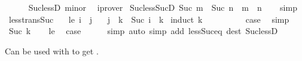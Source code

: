 \begin{isabellebody}
\ \ \ \ \isamarkupfalse%
\ Suc{\isacharunderscore}{\kern0pt}lessD\ minor\ \isamarkupfalse%
\ iprover\isanewline
{}\isamarkupfalse%
%
\endisatagproof
{\isafoldproof}%
%
\isadelimproof
\isanewline
%
\endisadelimproof
\isanewline
{}\isamarkupfalse%
\ Suc{\isacharunderscore}{\kern0pt}less{\isacharunderscore}{\kern0pt}SucD{\isacharcolon}{\kern0pt}\ {\isachardoublequoteopen}Suc\ m\ {\isacharless}{\kern0pt}\ Suc\ n\ {\isasymLongrightarrow}\ m\ {\isacharless}{\kern0pt}\ n{\isachardoublequoteclose}\isanewline
%
\isadelimproof
\ \ %
\endisadelimproof
%
\isatagproof
{}\isamarkupfalse%
\ simp%
\endisatagproof
{\isafoldproof}%
%
\isadelimproof
\isanewline
%
\endisadelimproof
\isanewline
{}\isamarkupfalse%
\ less{\isacharunderscore}{\kern0pt}trans{\isacharunderscore}{\kern0pt}Suc{\isacharcolon}{\kern0pt}\isanewline
\ \ \ le{\isacharcolon}{\kern0pt}\ {\isachardoublequoteopen}i\ {\isacharless}{\kern0pt}\ j{\isachardoublequoteclose}\isanewline
\ \ \ {\isachardoublequoteopen}j\ {\isacharless}{\kern0pt}\ k\ {\isasymLongrightarrow}\ Suc\ i\ {\isacharless}{\kern0pt}\ k{\isachardoublequoteclose}\isanewline
%
\isadelimproof
%
\endisadelimproof
%
\isatagproof
{}\isamarkupfalse%
\ {\isacharparenleft}{\kern0pt}induct\ k{\isacharparenright}{\kern0pt}\isanewline
\ \ \isamarkupfalse%
\ {}\isanewline
\ \ \isamarkupfalse%
\ \isamarkupfalse%
\ {\isacharquery}{\kern0pt}case\ \isamarkupfalse%
\ simp\isanewline
{}\isamarkupfalse%
\isanewline
\ \ \isamarkupfalse%
\ {\isacharparenleft}{\kern0pt}Suc\ k{\isacharparenright}{\kern0pt}\isanewline
\ \ \isamarkupfalse%
\ le\ \isamarkupfalse%
\ {\isacharquery}{\kern0pt}case\isanewline
\ \ \ \ \isamarkupfalse%
\ simp\ {\isacharparenleft}{\kern0pt}auto\ simp\ add{\isacharcolon}{\kern0pt}\ less{\isacharunderscore}{\kern0pt}Suc{\isacharunderscore}{\kern0pt}eq\ dest{\isacharcolon}{\kern0pt}\ Suc{\isacharunderscore}{\kern0pt}lessD{\isacharparenright}{\kern0pt}\isanewline
{}\isamarkupfalse%
%
\endisatagproof
{\isafoldproof}%
%
\isadelimproof
%
\endisadelimproof
%
\begin{isamarkuptext}%
Can be used with  to get .%
\end{isamarkuptext}\isamarkuptrue%

\end{isabellebody}
